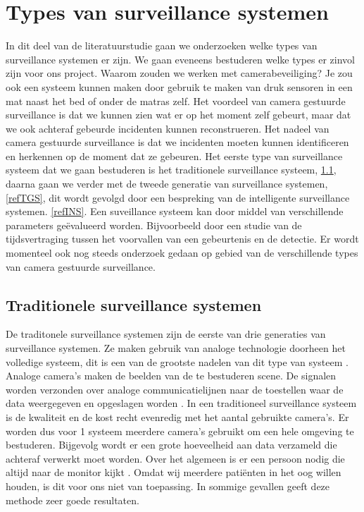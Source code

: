 \section{Types van surveillance systemen}
\label{refTVS}
In dit deel van de literatuurstudie gaan we onderzoeken welke types van surveillance systemen er zijn. We gaan eveneens bestuderen welke types er zinvol zijn voor ons project. Waarom zouden we werken met camerabeveiliging? Je zou ook een systeem kunnen maken door gebruik te maken van druk sensoren in een mat naast het bed of onder de matras zelf. Het voordeel van camera gestuurde surveillance is dat we kunnen zien wat er op het moment zelf gebeurt, maar dat we ook achteraf gebeurde incidenten kunnen reconstrueren. Het nadeel van camera gestuurde surveillance is dat we incidenten moeten kunnen identificeren en herkennen op de moment dat ze gebeuren\cite{bibVTC3}. Het eerste type van surveillance systeem dat we gaan bestuderen is het traditionele surveillance systeem, \ref{refTST}, daarna gaan we verder met de tweede generatie van surveillance systemen, \ref{refTGS}, dit wordt gevolgd door een bespreking van de intelligente surveillance systemen. \ref{refINS}.  Een suveillance systeem kan door middel van verschillende parameters ge\"evalueerd worden. Bijvoorbeeld door een studie van de tijdsvertraging tussen het voorvallen van een gebeurtenis en de detectie. Er wordt momenteel ook nog steeds onderzoek gedaan op gebied van de verschillende types van camera gestuurde surveillance. 

\subsection{Traditionele surveillance systemen}
\label{refTST}
De traditonele surveillance systemen zijn de eerste van drie generaties van surveillance systemen. Ze maken gebruik van analoge technologie doorheen het volledige systeem, dit is een van de grootste nadelen van dit type van systeem \cite{bibIPC2}.  Analoge camera's maken de beelden van de te bestuderen scene. De signalen worden verzonden over analoge communicatielijnen naar de  toestellen waar de data weergegeven en opgeslagen worden \cite{bibVTC2}.
In een traditioneel surveillance systeem is de kwaliteit en de kost recht evenredig met het aantal gebruikte camera's. Er worden dus voor 1 systeem meerdere camera's gebruikt om een hele omgeving te bestuderen. Bijgevolg wordt er een grote hoeveelheid aan data verzameld die achteraf verwerkt moet worden. Over het algemeen is er een persoon nodig die altijd naar de monitor kijkt \cite{bibVTC}. Omdat wij meerdere pati\"enten in het oog willen houden, is dit voor ons niet van toepassing. In sommige gevallen geeft deze methode zeer goede resultaten. 

